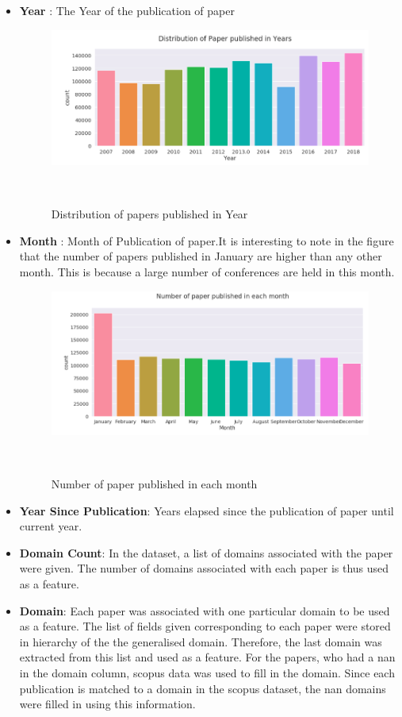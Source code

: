 \documentclass[a4paper, 11pt]{article}
\begin{document}
\begin{itemize}
    \item \textbf{Year} : The Year of the publication of paper
\begin{figure}[ht]
\centering
  \includegraphics[width=0.6\columnwidth]{Year_Distribution.png}
  \caption{Distribution of papers published in Year}~\label{fig:Reach}
\end{figure}
\FloatBarrier
    \item \textbf{Month} : Month of Publication of paper.It is interesting to note in the figure that the number of papers published in January are higher than any other month. This is because a large number of conferences are held in this month.
\begin{figure}[ht]
\centering
  \includegraphics[width=0.6\columnwidth]{Month_Distribution.png}
  \caption{Number of paper published in each month}~\label{fig:Reach}
\end{figure}
\FloatBarrier
    \item \textbf{Year Since Publication}: Years elapsed since the publication of paper until current year.
    \item \textbf{Domain Count}: In the dataset, a list of domains associated with the paper were given. The number of domains associated with each paper is thus used as a feature.
    \item \textbf{Domain}: Each paper was associated with one particular domain to be used as a feature. The list of fields given corresponding to each paper were stored in hierarchy of the the generalised domain. Therefore, the last domain was extracted from this list and used as a feature. For the papers, who had a nan in the domain column, scopus data was used to fill in the domain. Since each publication is matched to a domain in the scopus dataset, the nan domains were filled in using this information.

\end{itemize}
\end{document}
